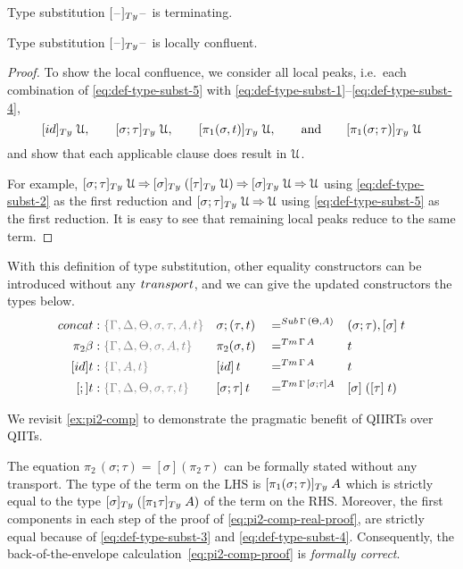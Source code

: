 \documentclass[a4paper,UKenglish,numberwithinsect,cleveref,thm-restate]{lipics-v2021}
\newcommand{\danger}{\marginpar[\hfill\dbend]{\dbend\hfill}}
\begin{document}
\begin{proposition}[Termination]
  Type substitution $[\blank]_{\Ty}\blank$ is terminating.
  \danger
\end{proposition}
\begin{proposition} \label{prop:local-confluence-1}
  Type substitution $[\blank]_{\Ty}\blank$ is locally confluent.
  \danger
\end{proposition}
\begin{proof}
  To show the local confluence, we consider all local peaks, i.e.\ each combination of \eqref{eq:def-type-subst-5} with \eqref{eq:def-type-subst-1}--\eqref{eq:def-type-subst-4},
  \[
    [\idS]_{\Ty}\;\UU, \qquad [\sigma;\tau]_{\Ty}\;\UU, \qquad [\pi_1(\sigma, t)]_{\Ty}\;\UU, \qquad\text{and}\qquad [\pi_1(\sigma; \tau)]_{\Ty}\;\UU
  \]
  and show that each applicable clause does result in $\mathcal{U}$.

  For example, $[\sigma;\tau]_{\Ty}\;\UU \reduce [\sigma]_{\Ty}\;([\tau]_{\Ty}\;\UU) \reduce [\sigma]_{\Ty}\;\UU \reduce \UU$ using \eqref{eq:def-type-subst-2} as the first reduction and $[\sigma;\tau]_{\Ty}\;\UU \reduce \UU$ using \eqref{eq:def-type-subst-5} as the first reduction.
  It is easy to see that remaining local peaks reduce to the same term.
\end{proof}

With this definition of type substitution, other equality constructors can be introduced without any $\transp$, and we can give the updated constructors the types below.
\begin{alignat*}{5}
  \mathsf{concat} & : \implicit{\Gamma, \Delta, \Theta, \sigma, \tau, A, t} &&\sigma ; (\tau , t) && =^{\Sub\,\Gamma\,(\Theta, A)} &&  (\sigma ; \tau), [ \sigma ]\;t \\
  \pi_2\beta      & : \implicit{\Gamma, \Delta, \Theta, \sigma, A, t} && \pi_2(\sigma , t)        && =^{\Tm\,\Gamma\, A} &&  t \\
  [\idS]t         & : \implicit{\Gamma, A, t} && {[\idS]\,t}          && =^{\Tm\,\Gamma\,A} && t \\
  [;]t            & : \implicit{\Gamma, \Delta, \Theta, \sigma, \tau, t} && {[\sigma ; \tau]\,t} && =^{\Tm\,\Gamma\,[\sigma ; \tau] A} && {[ \sigma ]\;([ \tau ]\;t})
\end{alignat*}

We revisit \cref{ex:pi2-comp} to demonstrate the pragmatic benefit of QIIRTs over QIITs.
\begin{example}
  The equation $\pi_2\,(\sigma; \tau) = [\sigma](\pi_2\,\tau)$ can be formally stated without any transport.
  The type of the term on the LHS is $[\pi_1(\sigma;\tau)]_{\Ty}\;A$ which is strictly equal to the type $[\sigma]_\Ty\;([\pi_1\tau]_\Ty\;A)$ of the term on the RHS.
  Moreover, the first components in each step of the proof of \eqref{eq:pi2-comp-real-proof}, are strictly equal because of \eqref{eq:def-type-subst-3} and \eqref{eq:def-type-subst-4}.
  Consequently, the back-of-the-envelope calculation~\eqref{eq:pi2-comp-proof} is \emph{formally correct}.
\end{example}
\end{document}
